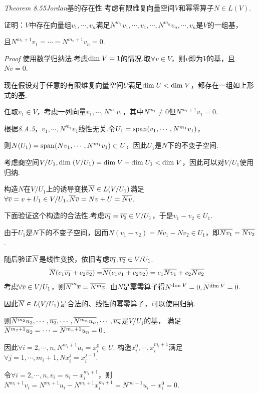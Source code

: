 \textit{Theorem 8.55}\textit{Jordan}{\kaishu 基的存在性}
考虑有限维复向量空间\(V\)和幂零算子\(N \in L(V)\).

证明：\(V\)中存在向量组\(v_1,\cdots,v_n\)满足\(N^{m_1}v_1,\cdots,v_1,\cdots,N^{m_n}v_n,\cdots,v_n\)是\(V\)的一组基，

且\(N^{m_1+1}v_1=\cdots=N^{m_n+1}v_n=0\).

\textit{Proof}
使用数学归纳法.考虑\(\mathrm{dim \;} V=1\)的情况.取\(\forall v \in V\)，则\(v\)即为\(V\)的基，且\(Nv=0\).

现在假设对于任意的有限维复向量空间\(U\)满足\(\mathrm{dim \;} U<\mathrm{dim \;} V\)，都存在一组如上形式的基.

任取\(v_1 \in V\)，考虑一列向量\(v_1,\cdots,N^{m_1}v_1\)，其中\(N^{m_1} \ne 0\)但\(N^{m_1+1}v_1=0\).

根据\textit{8.A.5}，\(v_1,\cdots,N^{m_1}v_1\)线性无关.令\(U_1=\mathrm{span} (v_1,\cdots,N^{m_1}v_1)\)，

则\(N(U_1)=\mathrm{span} (Nv_1,\cdots,N^{m_1}v_1) \subset U\)，因此\(U_1\)是\(N\)下的不变子空间.

考虑商空间\(V/U_1,\mathrm{dim \;} (V/U_1)=\mathrm{dim \;} V-\mathrm{dim \;} U_1<\mathrm{dim \;} V\)，因此可以对\(V/U_1\)使用归纳.

构造\(N\)在\(V/U_1\)上的诱导变换\(\overline{N} \in L(V/U_1)\)满足\(\forall \overline{v}=v+U_1 \in V/U_1,\overline{N}\overline{v}=Nv+U=\overline{Nv}\).

下面验证这个构造的合法性.考虑\(\overline{v_1}=\overline{v_2} \in V/U_1\)，于是\(v_1-v_2 \in U_1\).

由于\(U_1\)是\(N\)下的不变子空间，因而\(N(v_1-v_2)=Nv_1-Nv_2 \in U_1\)，即\(\overline{Nv_1}=\overline{Nv_2}\).

随后验证\(\overline{N}\)是线性变换，依旧考虑\(\overline{v_1},\overline{v_2} \in V/U_1\).
    \begin{align*}
        \overline{N}(c_1\overline{v_1}+c_2\overline{v_2})=&\overline{N(c_1v_1+c_2v_2)} =c_1\overline{Nv_1}+c_2\overline{Nv_2}
    \end{align*}
考虑\(\forall \overline{v} \in V/U_1\)，则\(\overline{N}^m \overline{v}=\overline{N^m v}\).
由\(N\)是幂零算子得\(N^{\mathrm{dim \;} V}=0,\overline{N^{\mathrm{dim \;} V}}=\overline{0}\).

因此\(\overline{N} \in L(V/U_1)\)是合法的、线性的幂零算子，可以使用归纳.

则\(\overline{N^{m_2}u_2},\cdots,\overline{u_2},\cdots,\overline{N^{m_n}u_n},\cdots,\overline{u_n}\)是\(V/U_1\)的基，
满足\(\overline{N^{m_2+1}u_2}=\cdots=\overline{N^{m_n+1}u_n}=\overline{0}\).

因此\(\forall i=2,\cdots,n,N^{m_i+1}u_i=x_i^0 \in U\).
构造\(x_i^0,\cdots,x_i^{m_i+1}\)满足\(\forall j=1,\cdots,m_i+1,Nx_i^j=x_i^{j-1}\).

令\(\forall i=2,\cdots,n,v_i=u_i-x_i^{m_i+1}\)，则\(N^{m_i+1}v_i=N^{m_i+1}u_i-N^{m_i+1}x_i^{m_i+1}=N^{m_i+1}u_i-x_i^0=0\).

